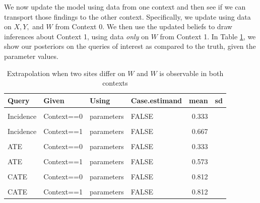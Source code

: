 \documentclass[
  12pt,
]{book}
\begin{document}
We now update the model using data from one context and then see if we can transport those findings to the other context. Specifically, we update using data on \(X, Y,\) and \(W\) from Context 0. We then use the updated beliefs to draw inferences about Context 1, using data \emph{only} on \(W\) from Context 1. In Table \ref{tab:appev3}, we show our posteriors on the queries of interest as compared to the truth, given the parameter values.

\begin{table}

\caption{\label{tab:appev3}Extrapolation when two sites differ on $W$ and $W$ is observable in both contexts}
\centering
\begin{tabular}[t]{llllrr}
\toprule
Query & Given & Using & Case.estimand & mean & sd\\
\midrule
\cellcolor{gray!6}{Incidence} & \cellcolor{gray!6}{Context==0} & \cellcolor{gray!6}{posteriors} & \cellcolor{gray!6}{FALSE} & \cellcolor{gray!6}{0.324} & \cellcolor{gray!6}{0.007}\\
Incidence & Context==0 & parameters & FALSE & 0.333 & \\
\cellcolor{gray!6}{Incidence} & \cellcolor{gray!6}{Context==1} & \cellcolor{gray!6}{posteriors} & \cellcolor{gray!6}{FALSE} & \cellcolor{gray!6}{0.676} & \cellcolor{gray!6}{0.007}\\
Incidence & Context==1 & parameters & FALSE & 0.667 & \\
\cellcolor{gray!6}{ATE} & \cellcolor{gray!6}{Context==0} & \cellcolor{gray!6}{posteriors} & \cellcolor{gray!6}{FALSE} & \cellcolor{gray!6}{0.330} & \cellcolor{gray!6}{0.011}\\
\addlinespace
ATE & Context==0 & parameters & FALSE & 0.333 & \\
\cellcolor{gray!6}{ATE} & \cellcolor{gray!6}{Context==1} & \cellcolor{gray!6}{posteriors} & \cellcolor{gray!6}{FALSE} & \cellcolor{gray!6}{0.578} & \cellcolor{gray!6}{0.009}\\
ATE & Context==1 & parameters & FALSE & 0.573 & \\
\cellcolor{gray!6}{CATE} & \cellcolor{gray!6}{Context==0} & \cellcolor{gray!6}{posteriors} & \cellcolor{gray!6}{FALSE} & \cellcolor{gray!6}{0.807} & \cellcolor{gray!6}{0.009}\\
CATE & Context==0 & parameters & FALSE & 0.812 & \\
\addlinespace
\cellcolor{gray!6}{CATE} & \cellcolor{gray!6}{Context==1} & \cellcolor{gray!6}{posteriors} & \cellcolor{gray!6}{FALSE} & \cellcolor{gray!6}{0.807} & \cellcolor{gray!6}{0.009}\\
CATE & Context==1 & parameters & FALSE & 0.812 & \\
\bottomrule
\end{tabular}
\end{table}
\end{document}
